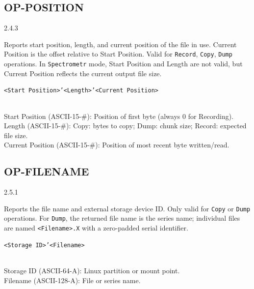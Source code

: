 \subsection{OP-POSITION}
\label{mib:op-fileposition}
\begin{description}[style=nextline]
    \item[Index:] 2.4.3
    \item[Description:]
        Reports start position, length, and current position of the file in
        use.  Current Position is the offset relative to Start Position.
        Valid for \texttt{Record}, \texttt{Copy}, \texttt{Dump} operations.
        In \texttt{Spectrometr} mode, Start Position and Length are not valid,
        but Current Position reflects the current output file size.
    \item[Response Format:]
        \texttt{<Start Position>'<Length>'<Current Position>}
    \item[Response Elements:]~\\
        Start Position (ASCII-15-\#): Position of first byte (always 0 for Recording). \\
        Length (ASCII-15-\#): Copy: bytes to copy; Dump: chunk size; Record: expected file size. \\
        Current Position (ASCII-15-\#): Position of most recent byte written/read.
\end{description}

\subsection{OP-FILENAME}
\label{mib:op-filename}
\begin{description}[style=nextline]
    \item[Index:] 2.5.1
    \item[Description:]
        Reports the file name and external storage device ID.  Only valid for
        \texttt{Copy} or \texttt{Dump} operations.  For \texttt{Dump}, the
        returned file name is the series name; individual files are named
        \texttt{<Filename>.X} with a zero-padded serial identifier.
    \item[Response Format:] \texttt{<Storage ID>'<Filename>}
    \item[Response Elements:]~\\
        Storage ID (ASCII-64-A): Linux partition or mount point. \\
        Filename (ASCII-128-A): File or series name.
\end{description}

